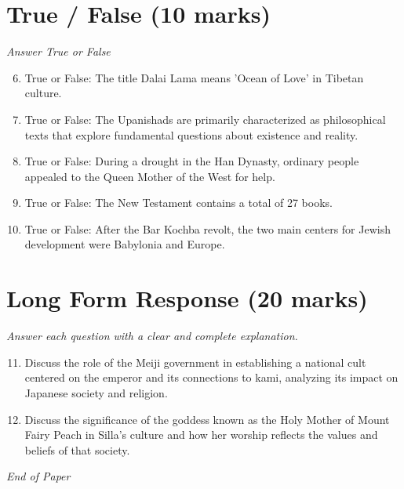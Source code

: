 \documentclass[12pt]{article}
\begin{document}
\section*{True / False (10 marks)}
\textit{Answer True or False}
\begin{enumerate}[label=\arabic*.]
\setcounter{enumi}{5}
\item True or False: The title Dalai Lama means 'Ocean of Love' in Tibetan culture.
\item True or False: The Upanishads are primarily characterized as philosophical texts that explore fundamental questions about existence and reality.
\item True or False: During a drought in the Han Dynasty, ordinary people appealed to the Queen Mother of the West for help.
\item True or False: The New Testament contains a total of 27 books.
\item True or False: After the Bar Kochba revolt, the two main centers for Jewish development were Babylonia and Europe.
\end{enumerate}

\section*{Long Form Response (20 marks)}
\textit{Answer each question with a clear and complete explanation.}
\begin{enumerate}[label=\arabic*.]
\setcounter{enumi}{10}
\item Discuss the role of the Meiji government in establishing a national cult centered on the emperor and its connections to kami, analyzing its impact on Japanese society and religion.
\item Discuss the significance of the goddess known as the Holy Mother of Mount Fairy Peach in Silla's culture and how her worship reflects the values and beliefs of that society.
\end{enumerate}

\vfill
\noindent\textit{End of Paper}
\end{document}
